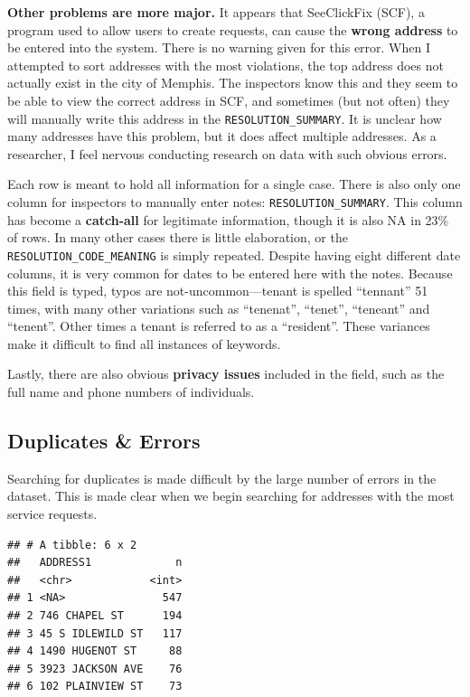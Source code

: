 \documentclass[
]{book}
\begin{document}
\textbf{Other problems are more major.} It appears that SeeClickFix (SCF), a program used to allow users to create requests, can cause the \textbf{wrong address} to be entered into the system. There is no warning given for this error. When I attempted to sort addresses with the most violations, the top address does not actually exist in the city of Memphis. The inspectors know this and they seem to be able to view the correct address in SCF, and sometimes (but not often) they will manually write this address in the \texttt{RESOLUTION\_SUMMARY}. It is unclear how many addresses have this problem, but it does affect multiple addresses. As a researcher, I feel nervous conducting research on data with such obvious errors.

Each row is meant to hold all information for a single case. There is also only one column for inspectors to manually enter notes: \texttt{RESOLUTION\_SUMMARY}. This column has become a \textbf{catch-all} for legitimate information, though it is also NA in 23\% of rows. In many other cases there is little elaboration, or the \texttt{RESOLUTION\_CODE\_MEANING} is simply repeated. Despite having eight different date columns, it is very common for dates to be entered here with the notes. Because this field is typed, typos are not-uncommon---tenant is spelled ``tennant'' 51 times, with many other variations such as ``tenenat'', ``tenet'', ``teneant'' and ``tenent''. Other times a tenant is referred to as a ``resident''. These variances make it difficult to find all instances of keywords.

Lastly, there are also obvious \textbf{privacy issues} included in the field, such as the full name and phone numbers of individuals.

\hypertarget{duplicates-errors}{%
\subsection{Duplicates \& Errors}\label{duplicates-errors}}

Searching for duplicates is made difficult by the large number of errors in the dataset. This is made clear when we begin searching for addresses with the most service requests.

\begin{verbatim}
## # A tibble: 6 x 2
##   ADDRESS1             n
##   <chr>            <int>
## 1 <NA>               547
## 2 746 CHAPEL ST      194
## 3 45 S IDLEWILD ST   117
## 4 1490 HUGENOT ST     88
## 5 3923 JACKSON AVE    76
## 6 102 PLAINVIEW ST    73
\end{verbatim}
\end{document}
